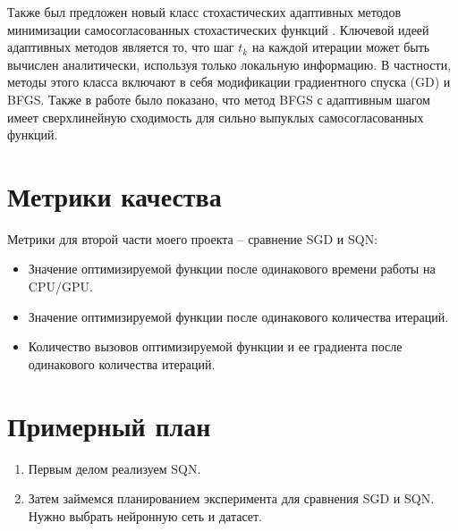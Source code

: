 \documentclass[]{scrartcl}
\begin{document}
Также был предложен новый класс стохастических адаптивных методов минимизации самосогласованных стохастических функций \cite{conf/icml/ZhouGG17}. Ключевой идеей адаптивных методов является то, что шаг $t_k$ на каждой итерации может быть вычислен аналитически, используя только локальную информацию. В частности, методы этого класса включают в себя модификации градиентного спуска (GD) и BFGS. Также в работе \cite{journals/oms/GaoG19} было показано, что метод BFGS с адаптивным шагом имеет сверхлинейную сходимость для сильно выпуклых самосогласованных функций. 


\section{Метрики качества}

Метрики для второй части моего проекта -- сравнение SGD и SQN:

\begin{itemize}
\item Значение оптимизируемой функции после одинакового времени работы на CPU/GPU.
\item Значение оптимизируемой функции после одинакового количества итераций.
\item Количество вызовов оптимизируемой функции и ее градиента после одинакового количества итераций.
\end{itemize}

\section{Примерный план}

\begin{enumerate}
\item Первым делом реализуем SQN.
\item Затем займемся планированием эксперимента для сравнения SGD и SQN. Нужно выбрать  нейронную сеть и датасет.
\end{enumerate}



\end{document}
